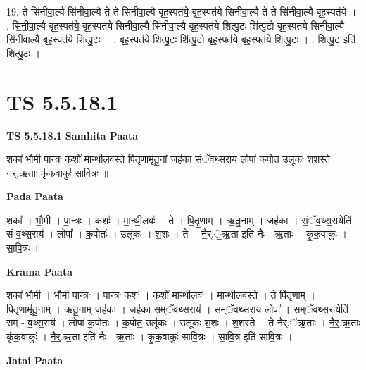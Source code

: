 \documentclass[17pt]{extarticle}
\begin{document}
19. ते सि॑नीवा॒ल्यै सि॑नीवा॒ल्यै ते ते सि॑नीवा॒ल्यै बृह॒स्पत॑ये॒ बृह॒स्पत॑ये सिनीवा॒ल्यै ते ते सि॑नीवा॒ल्यै बृह॒स्पत॑ये । . सि॒नी॒वा॒ल्यै बृह॒स्पत॑ये॒ बृह॒स्पत॑ये सिनीवा॒ल्यै सि॑नीवा॒ल्यै बृह॒स्पत॑ये शित्पु॒टः शि॑त्पु॒टो बृह॒स्पत॑ये सिनीवा॒ल्यै सि॑नीवा॒ल्यै बृह॒स्पत॑ये शित्पु॒टः । . बृह॒स्पत॑ये शित्पु॒टः शि॑त्पु॒टो बृह॒स्पत॑ये॒ बृह॒स्पत॑ये शित्पु॒टः । . शि॒त्पु॒ट इति॑ शित्पु॒टः । \newline
\pagebreak
{}

\section{ TS 5.5.18.1 }

\textbf{TS 5.5.18.1 } \newline
\textbf{Samhita Paata} \newline

शका॑ भौ॒मी पा॒न्त्रः कशो॑ मान्थी॒लव॒स्ते पि॑तृ॒णामृ॑तू॒नां जह॑का संॅवथ्स॒राय॒ लोपा॑ क॒पोत॒ उलू॑कः श॒शस्ते न॑र्.ऋ॒ताः कृ॑क॒वाकुः॑ सावि॒त्रः ॥ \newline

\textbf{Pada Paata} \newline

शका᳚ । भौ॒मी । पा॒न्त्रः । कशः॑ । मा॒न्थी॒लवः॑ । ते । पि॒तृ॒णाम् । ऋ॒तू॒नाम् । जह॑का । सं॒ॅव॒थ्स॒रायेति॑ सं-व॒थ्स॒राय॑ । लोपा᳚ । क॒पोतः॑ । उलू॑कः । श॒शः । ते । नै॒र्.॒ऋ॒ता इति॑ नैः - ऋ॒ताः । कृ॒क॒वाकुः॑ । सा॒वि॒त्रः ॥  \newline


\textbf{Krama Paata} \newline

शका॑ भौ॒मी । भौ॒मी पा॒न्त्रः । पा॒न्त्रः कशः॑ । कशो॑ मान्थी॒लवः॑ । मा॒न्थी॒लव॒स्ते । ते पि॑तृ॒णाम् । पि॒तृ॒णामृ॑तू॒नाम् । ऋ॒तू॒नाम् जह॑का । जह॑का सम्ॅवथ्स॒राय॑ । स॒म्ॅव॒थ्स॒राय॒ लोपा᳚ । स॒म्ॅव॒थ्स॒रायेति॑ सम् - व॒थ्स॒राय॑ । लोपा॑ क॒पोतः॑ । क॒पोत॒ उलू॑कः । उलू॑कः श॒शः । श॒शस्ते । ते नैर्.॑ऋ॒ताः । नै॒र्॒.ऋ॒ताः कृ॑क॒वाकुः॑ । नै॒र्॒.ऋ॒ता इति॑ नैः - ऋ॒ताः । कृ॒क॒वाकुः॑ सावि॒त्रः । सा॒वि॒त्र इति॑ सावि॒त्रः । \newline

\textbf{Jatai Paata} \newline
\end{document}
